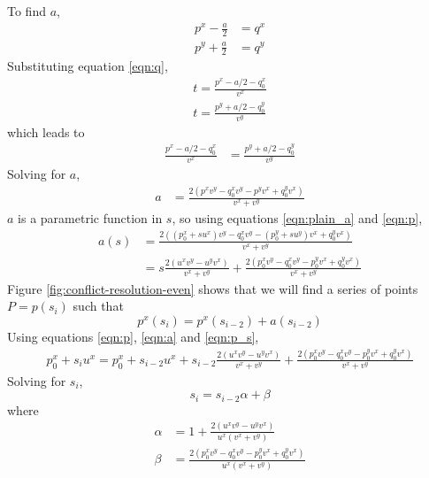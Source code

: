 \documentclass{egpubl}
\begin{document}
To find $a$,
\begin{align} 
p^x-\frac{a}{2} &= q^x \\
p^y+\frac{a}{2} &= q^y
\end{align}
Substituting equation \eqref{eqn:q},
\begin{align} 
t = \frac{p^x-a/2-q_0^x}{v^x} \\
t = \frac{p^y+a/2-q_0^y}{v^y}
\end{align}
which leads to
\begin{align} 
\frac{p^x-a/2-q_0^x}{v^x} &= \frac{p^y+a/2-q_0^y}{v^y}
\end{align}
Solving for $a$,
\begin{align}
\label{eqn:plain_a}
a &= \frac{2(p^xv^y-q_0^xv^y-p^yv^x+q_0^yv^x)}{v^x+v^y}
\end{align}
$a$ is a parametric function in $s$, so using equations \eqref{eqn:plain_a} and \eqref{eqn:p},
\begin{align}
a(s) &= \frac{2((p_0^x+su^x)v^y-q_0^xv^y-(p_0^y+su^y)v^x+q_0^yv^x)}{v^x+v^y} \\
     &= s\frac{2(u^xv^y-u^yv^x)}{v^x+v^y} + \frac{2(p_0^xv^y-q_0^xv^y-p_0^yv^x+q_0^yv^x)}{v^x+v^y} \label{eqn:a}
\end{align}
Figure \ref{fig:conflict-resolution-even} shows that we will find a series of points $P=p(s_i)$ such that
\begin{equation}
p^x(s_i) = p^x(s_{i-2})+a(s_{i-2}) \label{eqn:p_s}
\end{equation}
Using equations \eqref{eqn:p}, \eqref{eqn:a} and \eqref{eqn:p_s},
\begin{align}
p_0^x+s_iu^x = p_0^x+s_{i-2}u^x+s_{i-2}\frac{2(u^xv^y-u^yv^x)}{v^x+v^y} + \frac{2(p_0^xv^y-q_0^xv^y-p_0^yv^x+q_0^yv^x)}{v^x+v^y}
\end{align}
Solving for $s_i$,
\begin{equation}
\label{eqn:si_rec}
s_i = s_{i-2}\alpha + \beta
\end{equation}
where
\begin{align}
\alpha &= 1+\frac{2(u^xv^y-u^yv^x)}{u^x(v^x+v^y)} \\
\beta &= \frac{2(p_0^xv^y-q_0^xv^y-p_0^yv^x+q_0^yv^x)}{u^x(v^x+v^y)}
\end{align}
\end{document}
